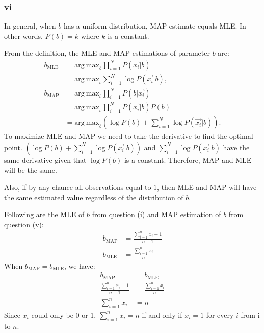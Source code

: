 \documentclass[twoside,11pt]{homework}
\begin{document}
\newpage
\subsubsection*{vi}
In general, when $b$ has a uniform distribution, MAP estimate equals MLE.
In other words, $P(b)=k$ where $k$ is a constant.  

From the definition, the MLE and MAP estimations of parameter $b$ are:
\begin{equation}
\begin{split}
b_{\mathrm{MLE}} &= \mathrm{arg\ max}_b \prod_{i=1}^N P(\overrightarrow{x_i}|b) \\
			   &= \mathrm{arg\ max}_b \sum_{i=1}^N \log P(\overrightarrow{x_i}|b) , \\
b_{\mathrm{MAP}} &= \mathrm{arg\ max}_b \prod_{i=1}^N P(b|\overrightarrow{x_i}) \\
                                   & = \mathrm{arg\ max}_b \prod_{i=1}^N P(\overrightarrow{x_i}|b) P(b) \\
                                   &= \mathrm{arg\ max}_b (\log P(b) + \sum_{i=1}^N \log P(\overrightarrow{x_i}|b)).
\end{split}
\end{equation}To maximize MLE and MAP we need to take the derivative to find the optimal point.
$(\log P(b) + \sum_{i=1}^N \log P(\overrightarrow{x_i}|b))$ and $\sum_{i=1}^N \log P(\overrightarrow{x_i}|b)$ have the same derivative given that $\log P(b) $ is a constant. Therefore, MAP and MLE will be the same. 

Also, if by any chance all observations equal to $1$, then MLE and MAP will have the same estimated value regardless of the distribution of $b$. 

Following are the MLE of $b$ from question (i) and MAP estimation of $b$ from question (v):
\begin{equation}
\begin{split}
b_\mathrm{MAP}  &= \frac{\sum_{i=1}^{n} x_i  + 1}{n+1} \\ %
b_\mathrm{MLE} &= \frac{\sum_{i=1}^{n} x_i}{n} %
\end{split}
\end{equation}
When $b_\mathrm{MAP} = b_\mathrm{MLE}$, we have:
\begin{equation}
\begin{split}
b_\mathrm{MAP} &= b_\mathrm{MLE} \\
\frac{\sum_{i=1}^{n} x_i  + 1}{n+1} &= \frac{\sum_{i=1}^{n} x_i}{n} \\
\sum_{i=1}^{n} x_i &= n
\end{split}
\end{equation}
Since $x_i$ could only be 0 or 1, $\sum_{i=1}^{n} x_i = n$ if and only if $x_i = 1$ for every $i$ from i to $n$.
\end{document}
